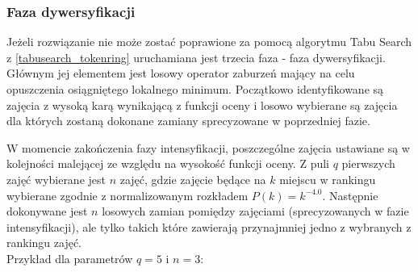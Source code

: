\subsubsection{Faza dywersyfikacji}
\par Jeżeli rozwiązanie nie może zostać poprawione za pomocą algorytmu Tabu Search z \ref{tabusearch_tokenring} uruchamiana jest trzecia faza - faza dywersyfikacji. Głównym jej elementem jest losowy operator zaburzeń mający na celu opuszczenia osiągniętego lokalnego minimum. Początkowo identyfikowane są zajęcia z wysoką karą wynikającą z funkcji oceny  i losowo wybierane są zajęcia dla których zostaną dokonane zamiany sprecyzowane w poprzedniej fazie.
\par W momencie zakończenia fazy intensyfikacji, poszczególne zajęcia ustawiane są w kolejności malejącej ze względu na wysokość funkcji oceny. Z puli $q$ pierwszych zajęć wybierane jest $n$ zajęć, gdzie zajęcie będące na $k$ miejscu w rankingu wybierane zgodnie z normalizowanym rozkładem $P(k) = k^{-4.0}$. Następnie dokonywane jest $n$ losowych zamian pomiędzy zajęciami (sprecyzowanych w fazie intensyfikacji), ale tylko takich które zawierają przynajmniej jedno z wybranych z rankingu zajęć. \\
Przykład dla parametrów $q = 5$ i $n = 3$:

